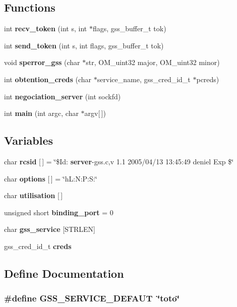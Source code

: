 \subsection*{Functions}
\begin{CompactItemize}
\item 
int {\bf recv\_\-token} (int s, int $\ast$flags, gss\_\-buffer\_\-t tok)
\item 
int {\bf send\_\-token} (int s, int flags, gss\_\-buffer\_\-t tok)
\item 
void {\bf sperror\_\-gss} (char $\ast$str, OM\_\-uint32 major, OM\_\-uint32 minor)
\item 
int {\bf obtention\_\-creds} (char $\ast$service\_\-name, gss\_\-cred\_\-id\_\-t $\ast$pcreds)
\item 
int {\bf negociation\_\-server} (int sockfd)
\item 
int {\bf main} (int argc, char $\ast$argv[$\,$])
\end{CompactItemize}
\subsection*{Variables}
\begin{CompactItemize}
\item 
char {\bf rcsid} [$\,$] = \char`\"{}\$Id: {\bf server}-gss.c,v 1.1 2005/04/13 13:45:49 deniel Exp \$\char`\"{}
\item 
char {\bf options} [$\,$] = \char`\"{}h\-L:N:P:S:\char`\"{}
\item 
char {\bf utilisation} [$\,$]
\item 
unsigned short {\bf binding\_\-port} = 0
\item 
char {\bf gss\_\-service} [STRLEN]
\item 
gss\_\-cred\_\-id\_\-t {\bf creds}
\end{CompactItemize}


\subsection{Define Documentation}
\subsubsection{\setlength{\rightskip}{0pt plus 5cm}\#define GSS\_\-SERVICE\_\-DEFAUT\ \char`\"{}toto\char`\"{}}\label{server-gss_8c_a5}




